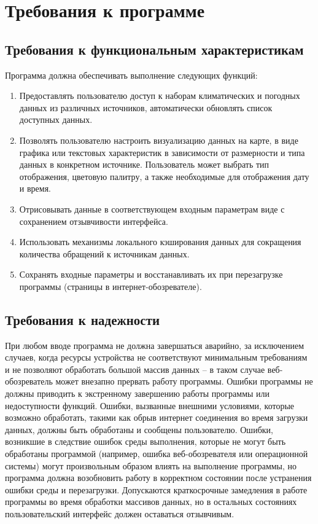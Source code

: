 \documentclass[a4paper, 12pt]{article}
\begin{document}
	\section{Требования к программе}

	\subsection{Требования к функциональным характеристикам}
	Программа должна обеспечивать выполнение следующих функций:
	\begin{enumerate}
		\item Предоставлять пользователю доступ к наборам климатических и погодных данных из различных источников,
			автоматически обновлять список доступных данных.

		\item Позволять пользователю настроить визуализацию данных на карте, в виде графика или текстовых характеристик в
			зависимости от размерности и типа данных в конкретном источнике. Пользователь может выбрать тип отображения,
			цветовую палитру, а также необходимые для отображения дату и время.

		\item Отрисовывать данные в соответствующем входным параметрам виде с сохранением отзывчивости интерфейса.

		\item Использовать механизмы локального кэширования данных для сокращения количества обращений к источникам данных.

		\item Сохранять входные параметры и восстанавливать их при перезагрузке программы (страницы в интернет-обозревателе).
	\end{enumerate}

	\subsection{Требования к надежности}
	\label{subsection:3_2} При любом вводе программа не должна завершаться аварийно, за исключением случаев, когда ресурсы
	устройства не соответствуют минимальным требованиям и не позволяют обработать большой массив данных -- в таком случае
	веб-обозреватель может внезапно прервать работу программы. Ошибки программы не должны приводить к экстренному завершению
	работы программы или недоступности функций. Ошибки, вызванные внешними условиями, которые возможно обработать, такими как
	обрыв интернет соединения во время загрузки данных, должны быть обработаны и сообщены пользователю. Ошибки, возникшие
	в следствие ошибок среды выполнения, которые не могут быть обработаны программой (например, ошибка веб-обозревателя или
	операционной системы) могут произвольным образом влиять на выполнение программы, но программа должна возобновить работу
	в корректном состоянии после устранения ошибки среды и перезагрузки. Допускаются краткосрочные замедления в работе
	программы во время обработки массивов данных, но в остальных состояниях пользовательский интерфейс должен оставаться отзывчивым.
\end{document}
